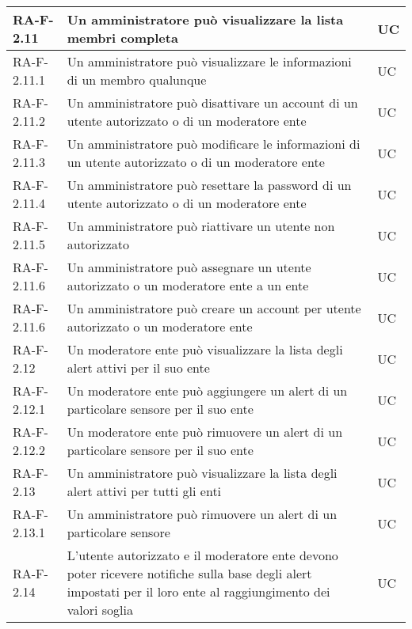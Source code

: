 \begin{center}
\begin{longtable}{|p{3cm}|p{10cm}|p{2cm}|}
		{\color{gray} RA-F-}2.11 & Un amministratore può visualizzare la lista membri completa & UC \\ \hline
		{\color{gray} RA-F-}2.11.1 & Un amministratore può visualizzare le informazioni di un membro qualunque & UC \\ \hline
		{\color{gray} RA-F-}2.11.2 & Un amministratore può disattivare un account di un utente autorizzato o di un moderatore ente & UC \\ \hline
		{\color{gray} RA-F-}2.11.3 & Un amministratore può modificare le informazioni di un utente autorizzato o di un moderatore ente & UC \\ \hline
		{\color{gray} RA-F-}2.11.4 & Un amministratore può resettare la password di un utente autorizzato o di un moderatore ente & UC \\ \hline
		{\color{gray} RA-F-}2.11.5 & Un amministratore può riattivare un utente non autorizzato & UC \\ \hline
		{\color{gray} RA-F-}2.11.6 & Un amministratore può assegnare un utente autorizzato o un moderatore ente a un ente & UC \\ \hline
		{\color{gray} RA-F-}2.11.6 & Un amministratore può creare un account per utente autorizzato o un moderatore ente & UC \\ \hline


		{\color{gray} RA-F-}2.12 & Un moderatore ente può visualizzare la lista degli alert attivi per il suo ente & UC \\ \hline
		{\color{gray} RA-F-}2.12.1 & Un moderatore ente può aggiungere un alert di un particolare sensore per il suo ente & UC \\ \hline
		{\color{gray} RA-F-}2.12.2 & Un moderatore ente può rimuovere un alert di un particolare sensore per il suo ente & UC \\ \hline
		{\color{gray} RA-F-}2.13 & Un amministratore può visualizzare la lista degli alert attivi per tutti gli enti & UC \\ \hline
		{\color{gray} RA-F-}2.13.1 & Un amministratore può rimuovere un alert di un particolare sensore & UC \\ \hline
		{\color{gray} RA-F-}2.14 & L'utente autorizzato e il moderatore ente devono poter ricevere notifiche sulla base degli alert impostati per il loro ente al raggiungimento dei valori soglia & UC \\ \hline


\end{longtable}
\end{center}
